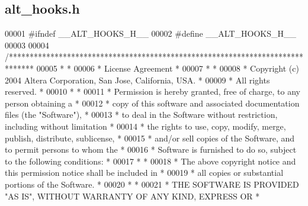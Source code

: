 \subsection{alt\+\_\+hooks.\+h}
\label{alt__hooks_8h_source}

\begin{DoxyCode}
00001 \textcolor{preprocessor}{#ifndef \_\_ALT\_HOOKS\_H\_\_}
00002 \textcolor{preprocessor}{#define \_\_ALT\_HOOKS\_H\_\_}
00003 
00004 \textcolor{comment}{/******************************************************************************}
00005 \textcolor{comment}{*                                                                             *}
00006 \textcolor{comment}{* License Agreement                                                           *}
00007 \textcolor{comment}{*                                                                             *}
00008 \textcolor{comment}{* Copyright (c) 2004 Altera Corporation, San Jose, California, USA.           *}
00009 \textcolor{comment}{* All rights reserved.                                                        *}
00010 \textcolor{comment}{*                                                                             *}
00011 \textcolor{comment}{* Permission is hereby granted, free of charge, to any person obtaining a     *}
00012 \textcolor{comment}{* copy of this software and associated documentation files (the "Software"),  *}
00013 \textcolor{comment}{* to deal in the Software without restriction, including without limitation   *}
00014 \textcolor{comment}{* the rights to use, copy, modify, merge, publish, distribute, sublicense,    *}
00015 \textcolor{comment}{* and/or sell copies of the Software, and to permit persons to whom the       *}
00016 \textcolor{comment}{* Software is furnished to do so, subject to the following conditions:        *}
00017 \textcolor{comment}{*                                                                             *}
00018 \textcolor{comment}{* The above copyright notice and this permission notice shall be included in  *}
00019 \textcolor{comment}{* all copies or substantial portions of the Software.                         *}
00020 \textcolor{comment}{*                                                                             *}
00021 \textcolor{comment}{* THE SOFTWARE IS PROVIDED "AS IS", WITHOUT WARRANTY OF ANY KIND, EXPRESS OR  *}

\end{DoxyCode}
